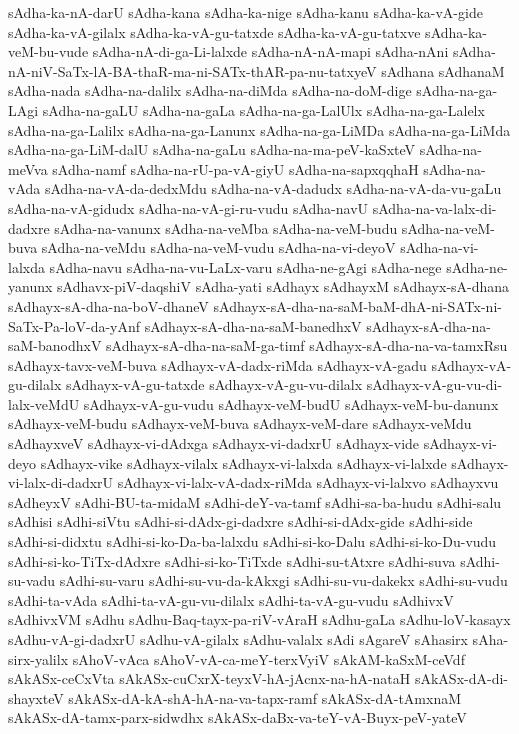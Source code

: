 {sAdha-ka-nA-darU
sAdha-kana
sAdha-ka-nige
sAdha-kanu
sAdha-ka-vA-gide
sAdha-ka-vA-gilalx
sAdha-ka-vA-gu-tatxde
sAdha-ka-vA-gu-tatxve
sAdha-ka-veM-bu-vude
sAdha-nA-di-ga-Li-lalxde
sAdha-nA-nA-mapi
sAdha-nAni
sAdha-nA-niV-SaTx-lA-BA-thaR-ma-ni-SATx-thAR-pa-nu-tatxyeV
sAdhana
sAdhanaM
sAdha-nada
sAdha-na-dalilx
sAdha-na-diMda
sAdha-na-doM-dige
sAdha-na-ga-LAgi
sAdha-na-gaLU
sAdha-na-gaLa
sAdha-na-ga-LalUlx
sAdha-na-ga-Lalelx
sAdha-na-ga-Lalilx
sAdha-na-ga-Lanunx
sAdha-na-ga-LiMDa
sAdha-na-ga-LiMda
sAdha-na-ga-LiM-dalU
sAdha-na-gaLu
sAdha-na-ma-peV-kaSxteV
sAdha-na-meVva
sAdha-namf
sAdha-na-rU-pa-vA-giyU
sAdha-na-sapxqqhaH
sAdha-na-vAda
sAdha-na-vA-da-dedxMdu
sAdha-na-vA-dadudx
sAdha-na-vA-da-vu-gaLu
sAdha-na-vA-gidudx
sAdha-na-vA-gi-ru-vudu
sAdha-navU
sAdha-na-va-lalx-di-dadxre
sAdha-na-vanunx
sAdha-na-veMba
sAdha-na-veM-budu
sAdha-na-veM-buva
sAdha-na-veMdu
sAdha-na-veM-vudu
sAdha-na-vi-deyoV
sAdha-na-vi-lalxda
sAdha-navu
sAdha-na-vu-LaLx-varu
sAdha-ne-gAgi
sAdha-nege
sAdha-ne-yanunx
sAdhavx-piV-daqshiV
sAdha-yati
sAdhayx
sAdhayxM
sAdhayx-sA-dhana
sAdhayx-sA-dha-na-boV-dhaneV
sAdhayx-sA-dha-na-saM-baM-dhA-ni-SATx-ni-SaTx-Pa-loV-da-yAnf
sAdhayx-sA-dha-na-saM-banedhxV
sAdhayx-sA-dha-na-saM-banodhxV
sAdhayx-sA-dha-na-saM-ga-timf
sAdhayx-sA-dha-na-va-tamxRsu
sAdhayx-tavx-veM-buva
sAdhayx-vA-dadx-riMda
sAdhayx-vA-gadu
sAdhayx-vA-gu-dilalx
sAdhayx-vA-gu-tatxde
sAdhayx-vA-gu-vu-dilalx
sAdhayx-vA-gu-vu-di-lalx-veMdU
sAdhayx-vA-gu-vudu
sAdhayx-veM-budU
sAdhayx-veM-bu-danunx
sAdhayx-veM-budu
sAdhayx-veM-buva
sAdhayx-veM-dare
sAdhayx-veMdu
sAdhayxveV
sAdhayx-vi-dAdxga
sAdhayx-vi-dadxrU
sAdhayx-vide
sAdhayx-vi-deyo
sAdhayx-vike
sAdhayx-vilalx
sAdhayx-vi-lalxda
sAdhayx-vi-lalxde
sAdhayx-vi-lalx-di-dadxrU
sAdhayx-vi-lalx-vA-dadx-riMda
sAdhayx-vi-lalxvo
sAdhayxvu
sAdheyxV
sAdhi-BU-ta-midaM
sAdhi-deY-va-tamf
sAdhi-sa-ba-hudu
sAdhi-salu
sAdhisi
sAdhi-siVtu
sAdhi-si-dAdx-gi-dadxre
sAdhi-si-dAdx-gide
sAdhi-side
sAdhi-si-didxtu
sAdhi-si-ko-Da-ba-lalxdu
sAdhi-si-ko-Dalu
sAdhi-si-ko-Du-vudu
sAdhi-si-ko-TiTx-dAdxre
sAdhi-si-ko-TiTxde
sAdhi-su-tAtxre
sAdhi-suva
sAdhi-su-vadu
sAdhi-su-varu
sAdhi-su-vu-da-kAkxgi
sAdhi-su-vu-dakekx
sAdhi-su-vudu
sAdhi-ta-vAda
sAdhi-ta-vA-gu-vu-dilalx
sAdhi-ta-vA-gu-vudu
sAdhivxV
sAdhivxVM
sAdhu
sAdhu-Baq-tayx-pa-riV-vAraH
sAdhu-gaLa
sAdhu-loV-kasayx
sAdhu-vA-gi-dadxrU
sAdhu-vA-gilalx
sAdhu-valalx
sAdi
sAgareV
sAhasirx
sAha-sirx-yalilx
sAhoV-vAca
sAhoV-vA-ca-meY-terxVyiV
sAkAM-kaSxM-ceVdf
sAkASx-ceCxVta
sAkASx-cuCxrX-teyxV-hA-jAcnx-na-hA-nataH
sAkASx-dA-di-shayxteV
sAkASx-dA-kA-shA-hA-na-va-tapx-ramf
sAkASx-dA-tAmxnaM
sAkASx-dA-tamx-parx-sidwdhx
sAkASx-daBx-va-teY-vA-Buyx-peV-yateV
}
